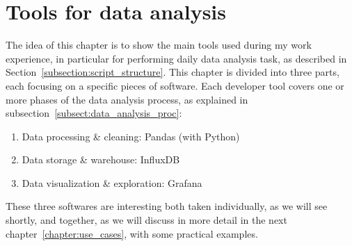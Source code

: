 \chapter{Tools for data analysis}
The idea of this chapter is to show the main tools used during my work experience, in particular for performing daily data analysis task, as described in Section~\ref{subsection:script_structure}.
This chapter is divided into three parts, each focusing on a specific pieces of software. Each developer tool covers one or more phases of the data analysis process, as explained in subsection~\ref{subsect:data_analysis_proc}:
\begin{enumerate}
    \item Data processing \& cleaning: Pandas (with Python)
    \item Data storage \& warehouse: InfluxDB
    \item Data visualization \& exploration: Grafana 
\end{enumerate}
These three softwares are interesting both taken individually, as we will see shortly, and together, as we will discuss in more detail in the next chapter~\ref{chapter:use_cases}, with some practical examples.




